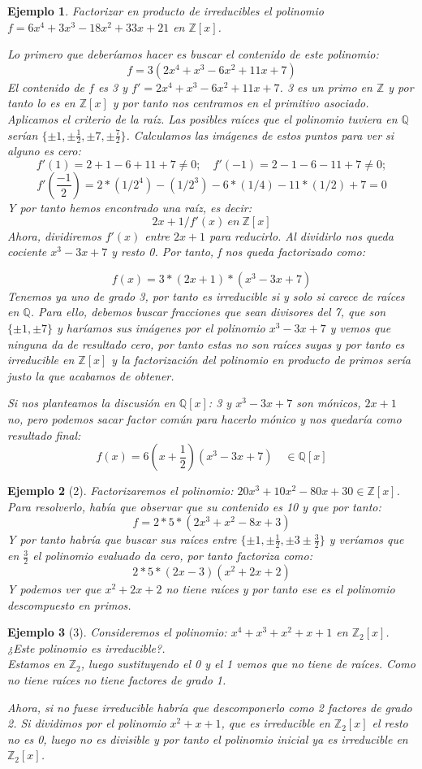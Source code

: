 \documentclass[11pt, a4paper, titlepage]{article}
\providecommand{\ent}{\mathbb{Z}}
\providecommand{\rac}{\mathbb{Q}}
\theoremstyle{theorem-style}
\theoremstyle{definition-style}
\theoremstyle{remark-style}
\theoremstyle{example-style}
\newtheorem*{ejemplo}{Ejemplo}
\begin{document}
\begin{ejemplo}
	Factorizar en producto de irreducibles el polinomio $f=6x^4+3x^3-18x^2+33x+21$ en $\ent[x]$.

Lo primero que deberíamos hacer es buscar el contenido de este polinomio:
\[
f=3(2x^4+x^3-6x^2+11x+7)
\]
El contenido de $f$ es 3 y $f'=2x^4+x^3-6x^2+11x+7$. 3 es un primo en $\ent $ y por tanto lo es en $\ent[x]$ y por tanto nos centramos en el primitivo asociado. Aplicamos el criterio de la raíz. Las posibles raíces que el polinomio tuviera en $\rac$ serían $\{\pm 1, \pm \frac{1}{2}, \pm 7, \pm \frac{7}{2}\}$. Calculamos las imágenes de estos puntos para ver si alguno es cero:
\[
f'(1) = 2+1-6+11 + 7 \ne 0; \quad f'(-1) = 2-1-6-11+7 \ne 0;\]
\[f'(\frac{-1}{2}) = 2*(1/2^4)-(1/2^3)-6*(1/4)-11*(1/2) + 7 = 0
\]
Y por tanto hemos encontrado una raíz, es decir:
\[
2x+1/f'(x) \ en \ \ent[x]
\]
Ahora, dividiremos $f'(x)$ entre $2x+1$ para reducirlo. Al dividirlo nos queda cociente $x^3-3x+7$ y resto 0. Por tanto, f nos queda factorizado como:

\[
f(x)=3*(2x+1)*(x^3-3x+7)
\]
Tenemos ya uno de grado 3, por tanto es irreducible si y solo si carece de raíces en $\rac$. Para ello, debemos buscar fracciones que sean divisores del 7, que son $\{\pm 1, \pm 7\}$ y haríamos sus imágenes por el polinomio $x^3-3x+7$ y vemos que ninguna da de resultado cero, por tanto estas no son raíces suyas y por tanto es irreducible en $\ent[x]$ y la factorización del polinomio en producto de primos sería justo la que acabamos de obtener.

Si nos planteamos la discusión en $\rac[x]$: 3 y $x^3-3x+7$ son mónicos, $2x+1$ no, pero podemos sacar factor común para hacerlo mónico y nos quedaría como resultado final:
\[
f(x)= 6(x+\frac{1}{2})(x^3-3x+7) \quad \in \rac[x]
\]
\end{ejemplo}
\begin{ejemplo}[2]
	Factorizaremos el polinomio: $20x^3 +10x^2-80x+30 \in \ent[x]$. Para resolverlo, había que observar que su contenido es 10 y que por tanto:
	\[
	f=2*5*(2x^3+x^2-8x+3)
	\]
	Y por tanto habría que buscar sus raíces entre $\{\pm 1, \pm \frac{1}{2}, \pm 3 \pm \frac{3}{2}\}$ y veríamos que en $\frac{3}{2}$ el polinomio evaluado da cero, por tanto factoriza como:
	\[
	2*5*(2x-3)(x^2+2x+2) 
	\]
	Y podemos ver que $x^2+2x+2$ no tiene raíces y por tanto ese es el polinomio descompuesto en primos.
\end{ejemplo}
\begin{ejemplo}[3]
	Consideremos el polinomio: $x^4+x^3+x^2+x+1$ en $\ent_2[x]$. ¿Este polinomio es irreducible?. \\Estamos en $\ent_2$, luego sustituyendo el 0 y el 1 vemos que no tiene de raíces. Como no tiene raíces no tiene factores de grado 1. 
	
	Ahora, si no fuese irreducible habría que descomponerlo como 2 factores de grado 2. Si dividimos por el polinomio $x^2+x+1$, que es irreducible en $\ent_2[x]$ el resto no es 0, luego no es divisible y por tanto el polinomio inicial ya es irreducible en $\ent_2[x]$.
\end{ejemplo}
\end{document}
